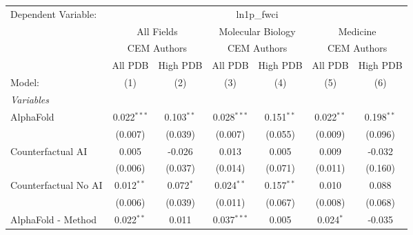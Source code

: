 \begingroup
\centering
\begin{tabular}{lcccccc}
   \tabularnewline \midrule \midrule
   Dependent Variable: & \multicolumn{6}{c}{ln1p\_fwci}\\
 & \multicolumn{2}{c}{All Fields} & \multicolumn{2}{c}{Molecular Biology} & \multicolumn{2}{c}{Medicine} \\
\cmidrule(lr){2-3} \cmidrule(lr){4-5} \cmidrule(lr){6-7}
 & \multicolumn{2}{c}{CEM Authors} & \multicolumn{2}{c}{CEM Authors} & \multicolumn{2}{c}{CEM Authors} \\
\cmidrule(lr){2-3} \cmidrule(lr){4-5} \cmidrule(lr){6-7}
 & \multicolumn{1}{c}{All PDB} & \multicolumn{1}{c}{High PDB} & \multicolumn{1}{c}{All PDB} & \multicolumn{1}{c}{High PDB} & \multicolumn{1}{c}{All PDB} & \multicolumn{1}{c}{High PDB} \\
\cmidrule(lr){2-2} \cmidrule(lr){3-3} \cmidrule(lr){4-4} \cmidrule(lr){5-5} \cmidrule(lr){6-6} \cmidrule(lr){7-7}
   Model:                                                     & (1)            & (2)          & (3)           & (4)          & (5)            & (6)\\  
   \midrule
   \emph{Variables}\\
   AlphaFold                                                  & 0.022$^{***}$  & 0.103$^{**}$ & 0.028$^{***}$ & 0.151$^{**}$ & 0.022$^{**}$   & 0.198$^{**}$\\   
                                                              & (0.007)        & (0.039)      & (0.007)       & (0.055)      & (0.009)        & (0.096)\\   
   Counterfactual AI                                          & 0.005          & -0.026       & 0.013         & 0.005        & 0.009          & -0.032\\   
                                                              & (0.006)        & (0.037)      & (0.014)       & (0.071)      & (0.011)        & (0.160)\\   
   Counterfactual No AI                                       & 0.012$^{**}$   & 0.072$^{*}$  & 0.024$^{**}$  & 0.157$^{**}$ & 0.010          & 0.088\\   
                                                              & (0.006)        & (0.039)      & (0.011)       & (0.067)      & (0.008)        & (0.068)\\   
   AlphaFold - Method                                         & 0.022$^{**}$   & 0.011        & 0.037$^{***}$ & 0.005        & 0.024$^{*}$    & -0.035\\   

\end{tabular}
